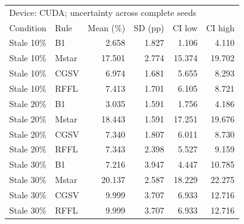 \begin{tabular}{llrrrr}
\toprule
\multicolumn{6}{l}{Device: CUDA; uncertainty across complete seeds} \\
Condition & Rule & Mean (\%) & SD (pp) & CI low & CI high \\
\midrule
Stale 10\% & B1 & 2.658 & 1.827 & 1.106 & 4.110 \\
Stale 10\% & Mstar & 17.501 & 2.774 & 15.374 & 19.702 \\
Stale 10\% & CGSV & 6.974 & 1.681 & 5.655 & 8.293 \\
Stale 10\% & RFFL & 7.413 & 1.701 & 6.105 & 8.721 \\
Stale 20\% & B1 & 3.035 & 1.591 & 1.756 & 4.186 \\
Stale 20\% & Mstar & 18.443 & 1.591 & 17.251 & 19.676 \\
Stale 20\% & CGSV & 7.340 & 1.807 & 6.011 & 8.730 \\
Stale 20\% & RFFL & 7.343 & 2.398 & 5.527 & 9.159 \\
Stale 30\% & B1 & 7.216 & 3.947 & 4.447 & 10.785 \\
Stale 30\% & Mstar & 20.137 & 2.587 & 18.229 & 22.275 \\
Stale 30\% & CGSV & 9.999 & 3.707 & 6.933 & 12.716 \\
Stale 30\% & RFFL & 9.999 & 3.707 & 6.933 & 12.716 \\
\bottomrule
\end{tabular}
